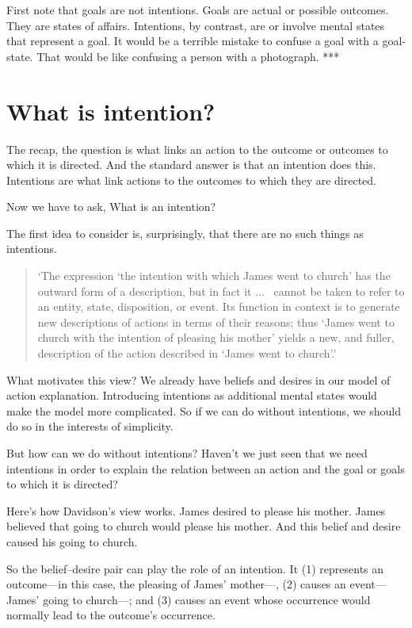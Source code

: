 \documentclass[12pt,\papersize]{extarticle}
\begin{document}
First note that goals are not intentions.
Goals are actual or possible outcomes.
They are states of affairs.
Intentions, by contrast, are or involve mental states that represent a goal.
It would be a terrible mistake to confuse a goal with a goal-state.
That would be like confusing a person with a photograph.
***


\section{What is intention?}
The recap, the question is what links an action to the outcome or outcomes to which it is directed.
And the standard answer is that an intention does this.
Intentions are what link  actions to the outcomes to which they are directed.

Now we have to ask, What is an intention?

The first idea to consider is, surprisingly, that there are no such things as intentions.
%
\begin{quote}
`The expression `the intention with which James went to church' has the outward form of a description, but in fact it
...\ %
 cannot be taken to refer to an entity, state, disposition, or event. Its function in context is to generate new descriptions of actions in terms of their reasons; thus `James went to church with the intention of pleasing his mother' yields a new, and fuller, description of the action described in `James went to church'.' 
\citep[p.\ 690]{davidson:1963_orig}
\end{quote}
%
What motivates this view?
We already have beliefs and desires in our model of action explanation.
Introducing intentions as additional mental states would make the model more complicated.
So if we can do without intentions, we should do so in the interests of simplicity.

But how can we do without intentions?
Haven't we just seen that we need intentions in order to explain the relation between an action and the goal or goals to which it is directed?

Here's how Davidson's view works.
James desired to please his mother.
James believed that going to church would please his mother.
And this belief and desire caused his going to church.

So the belief--desire pair can play the role of an intention.  
It (1) represents an outcome---in this case, the pleasing of James' mother---, (2) causes an event---James' going to church---; and (3) causes an event whose occurrence would normally lead to the outcome’s occurrence.
\end{document}
